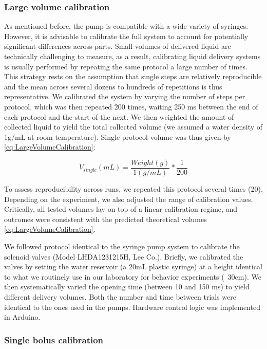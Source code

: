 \subsubsection*{Large volume calibration}
As mentioned before, the pump is compatible with a wide variety of syringes. However, it is advisable to calibrate the full system to account for potentially significant differences across parts. Small volumes of delivered liquid are technically challenging to measure, as a result, calibrating liquid delivery systems is usually performed by repeating the same protocol a large number of times. This strategy rests on the assumption that single steps are relatively reproducible and the mean across several dozens to hundreds of repetitions is thus representative. We calibrated the system by varying the number of steps per protocol, which was then repeated 200 times, waiting 250 ms between the end of each protocol and the start of the next. We then weighted the amount of collected liquid to yield the total collected volume (we assumed a water density of 1g/mL at room temperature). Single protocol volume was thus given by \ref{eq:LargeVolumeCalibration}:

\begin{equation} \label{eq:LargeVolumeCalibration}
    V_{single}(mL) = \frac{Weight (g)}{1 (g/mL)} * \frac{1}{200}
    \end{equation}

To assess reproducibility across runs, we repeated this protocol several times (20). Depending on the experiment, we also adjusted the range of calibration values. Critically, all tested volumes lay on top of a linear calibration regime, and outcomes were consistent with the predicted theoretical volumes \ref{eq:LargeVolumeCalibration}.

We followed protocol identical to the syringe pump system to calibrate the solenoid valves (Model LHDA1231215H, Lee Co.). Briefly, we calibrated the valves by setting the water reservoir (a 20mL plastic syringe) at a height identical to what we routinely use in our laboratory for behavior experiments (~30cm). We then systematically varied the opening time (between 10 and 150 ms) to yield different delivery volumes. Both the number and time between trials were identical to the ones used in the pumps. Hardware control logic was implemented in Arduino.

\subsubsection*{Single bolus calibration}

